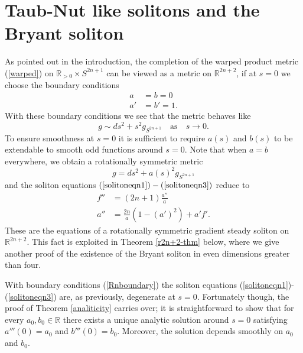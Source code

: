 \documentclass{amsart}
\theoremstyle{definition}
\theoremstyle{remark}
\numberwithin{equation}{section}
\newcommand{\R}{\mathbb{R}}  %
\newcommand{\N}{\mathbb{N}}
\begin{document}
\section{Taub-Nut like solitons and the Bryant soliton}
As pointed out in the introduction, the completion of the warped product metric (\ref{warped}) on $\R_{>0}\times S^{2n+1}$ can be viewed as a metric on $\R^{2n+2}$, if at $s=0$ we choose the boundary conditions
\begin{align} 
\label{Rnboundary}
a&=b=0 \\ \nonumber
a'&= b'=1.
\end{align}
With these boundary conditions we see that the metric behaves like
\begin{equation*}
 g \sim ds^2 + s^2 g_{S^{2n+1}} \quad \text{as} \quad s \rightarrow 0.
\end{equation*}
To ensure smoothness at $s=0$ it is sufficient to require $a(s)$ and $b(s)$ to be extendable to smooth odd functions around $s=0$. Note that when $a=b$ everywhere, we obtain a rotationally symmetric metric 
\begin{equation}
\label{radsymmetric}
g = ds^2 + a(s)^2 g_{S^{2n+1}}
\end{equation}
and the soliton equations $(\ref{solitoneqn1})-(\ref{solitoneqn3})$ reduce to 
\begin{align}
\label{bryant1}
f'' &= (2n+1)\frac{a''}{a} \\
\label{bryant2}
a''&= \frac{2n}{a}\left(1-(a')^2\right) + a'f'.
\end{align}
These are the equations of a rotationally symmetric gradient steady soliton on $\R^{2n+2}$. This fact is exploited in Theorem \ref{r2n+2-thm} below, where we give another proof of the existence of the Bryant soliton in even dimensions greater than four.  



With boundary conditions (\ref{Rnboundary}) the soliton equations (\ref{solitoneqn1})-(\ref{solitoneqn3}) are, as previously, degenerate at $s=0$. Fortunately though, the proof of Theorem \ref{analiticity} carries over; it is straightforward to show that for every $a_0, b_0 \in \R$ there exists a unique analytic solution around $s=0$ satisfying $a'''(0)=a_0$ and $b'''(0)=b_0$. Moreover, the solution depends smoothly on $a_0$ and $b_0$.
\end{document}
